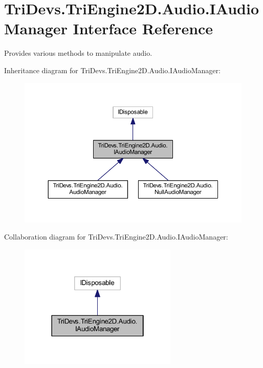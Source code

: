 \hypertarget{interface_tri_devs_1_1_tri_engine2_d_1_1_audio_1_1_i_audio_manager}{\section{Tri\-Devs.\-Tri\-Engine2\-D.\-Audio.\-I\-Audio\-Manager Interface Reference}
\label{interface_tri_devs_1_1_tri_engine2_d_1_1_audio_1_1_i_audio_manager}
}


Provides various methods to manipulate audio.  




Inheritance diagram for Tri\-Devs.\-Tri\-Engine2\-D.\-Audio.\-I\-Audio\-Manager\-:\nopagebreak
\begin{figure}[H]
\begin{center}
\leavevmode
\includegraphics[width=350pt]{interface_tri_devs_1_1_tri_engine2_d_1_1_audio_1_1_i_audio_manager__inherit__graph}
\end{center}
\end{figure}


Collaboration diagram for Tri\-Devs.\-Tri\-Engine2\-D.\-Audio.\-I\-Audio\-Manager\-:\nopagebreak
\begin{figure}[H]
\begin{center}
\leavevmode
\includegraphics[width=214pt]{interface_tri_devs_1_1_tri_engine2_d_1_1_audio_1_1_i_audio_manager__coll__graph}
\end{center}
\end{figure}
